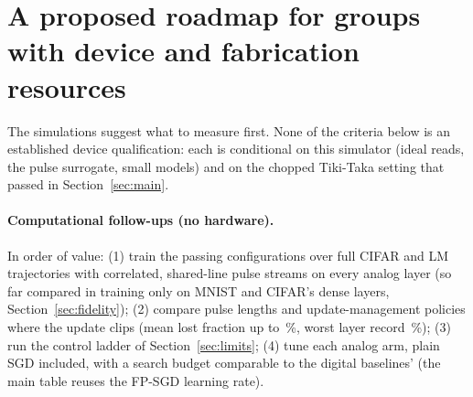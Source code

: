 \section{A proposed roadmap for groups with device and fabrication resources}\label{sec:roadmap}
The simulations suggest what to measure first. None of the criteria below is an established device qualification: each is
conditional on this simulator (ideal reads, the pulse surrogate, small models) and on the chopped Tiki-Taka setting that passed
in Section~\ref{sec:main}.

\paragraph{Computational follow-ups (no hardware).} In order of value: (1) train the passing configurations over full CIFAR and
LM trajectories with correlated, shared-line pulse streams on every analog layer (so far compared in training only on MNIST
and CIFAR's dense layers, Section~\ref{sec:fidelity}); (2) compare pulse lengths and update-management policies where the
update clips (mean lost fraction up to \RVLostCifarTtLayerMeanMaxPct\,\%, worst layer record \RVLostMaxPct\,\%); (3) run the
control ladder of Section~\ref{sec:limits}; (4) tune each analog arm, plain SGD included, with a search budget comparable to
the digital baselines' (the main table reuses the FP-SGD learning rate).

